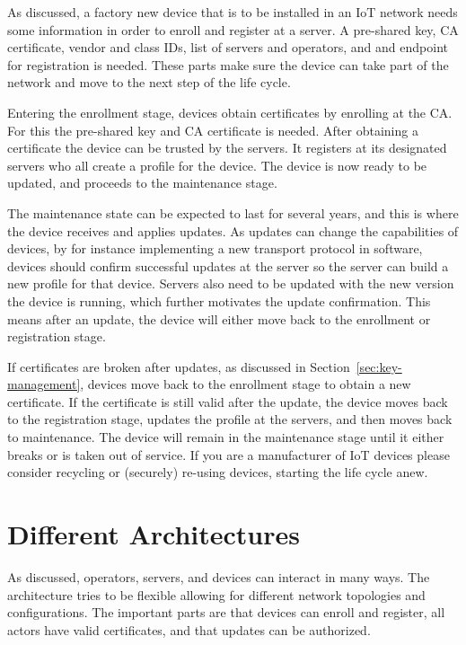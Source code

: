 \documentclass[0-thesis.tex]{subfiles}
\begin{document}
As discussed, a factory new device that is to be installed in an IoT network needs some
information in order to enroll and register at a server. A pre-shared key, CA certificate,
vendor and class IDs, list of servers and operators, and and endpoint for registration is
needed. These parts make sure the device can take part of the network and move to the next
step of the life cycle. 

Entering the enrollment stage, devices obtain certificates by enrolling at the CA. For
this the pre-shared key and CA certificate is needed. After obtaining a certificate the
device can be trusted by the servers. It registers at its designated servers who all
create a profile for the device. The device is now ready to be updated, and proceeds to
the maintenance stage.

The maintenance state can be expected to last for several years, and this is where the
device receives and applies updates. As updates can change the capabilities of devices, by
for instance implementing a new transport protocol in software, devices should confirm
successful updates at the server so the server can build a new profile for that device.
Servers also need to be updated with the new version the device is running, which further
motivates the update confirmation. This means after an update, the device will either move
back to the enrollment or registration stage.

If certificates are broken after updates, as discussed in Section~\ref{sec:key-management},
devices move back to the enrollment stage to obtain a new certificate. If the certificate
is still valid after the update, the device moves back to the registration stage, updates
the profile at the servers, and then moves back to maintenance. The device will remain in
the maintenance stage until it either breaks or is taken out of service. If you are a
manufacturer of IoT devices please consider recycling or (securely) re-using devices,
starting the life cycle anew.


\section{Different Architectures}
\label{ssec:different-architectures}
As discussed, operators, servers, and devices can interact in many ways. The architecture
tries to be flexible allowing for different network topologies and configurations. The
important parts are that devices can enroll and register, all actors have valid
certificates, and that updates can be authorized. 
\end{document}
